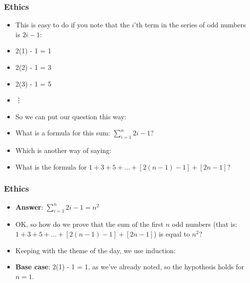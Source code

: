 \begin{frame}
\frametitle{Ethics}

\begin{itemize}[<+->]
\item 
This is easy to do if you note that the $i$'th term in the series of odd numbers is $2i - 1$:

\item 2(1) - 1 = 1 
\item 2(2) - 1 = 3 
\item 2(3) - 1 = 5 
\item \vdots

\item So we can put our question this way:

\item What is a formula for this sum: $ \sum\limits_{i=1}^n 2i - 1 $?

\item Which is another way of saying: 

\item What is the formula for $1+3+5+ \ldots + [2(n-1) - 1] + [2n - 1]?$

\end{itemize} 
\end{frame}


\begin{frame}
\frametitle{Ethics}

\begin{itemize}[<+->]
\item 

{\bf{Answer}}:  $ \sum\limits_{i=1}^n 2i - 1 = n^2$

\item 
OK, so how do we prove that the sum of the first $n$ odd numbers (that is:  $1+3+5+ \ldots + [2(n-1) - 1] + [2n - 1] $) is equal to $n^2$?

\item Keeping with the theme of the day, we use induction: 

\item {\bf{Base case}}: 2(1) - 1 = 1, as we've already noted, so the hypothesis holds for $n = 1$.

\end{itemize} 
\end{frame}


